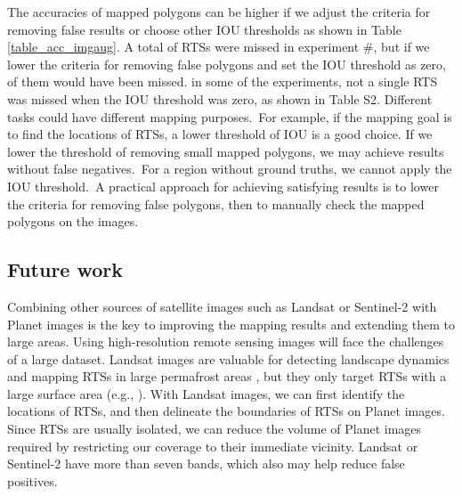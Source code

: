 \documentclass[authoryear,preprint,review,12pt]{elsarticle}
\begin{document}
The accuracies of mapped polygons can be higher if we adjust the criteria for removing false results or choose other IOU thresholds as shown in Table \ref{table_acc_imgaug}. 
A total of  RTSs were missed in experiment \#, but if we lower the criteria for removing false polygons and set the IOU threshold as zero,  of them would have been missed.  in some of the experiments, not a single RTS was missed when the IOU threshold was zero, as shown in Table S2. Different tasks could have different mapping purposes.~For example, if the mapping goal is to find the locations of RTSs, a lower threshold of IOU is a good choice. If we lower the threshold of removing small mapped polygons, we may achieve results without false negatives.~For a region without ground truths, we cannot apply the IOU threshold.~A practical approach for achieving satisfying results is to lower the criteria for removing false polygons, then to manually check the mapped polygons on the images. 


\subsection{Future work}
\label{subsec_future}

Combining other sources of satellite images such as Landsat or Sentinel-2 with Planet images is the key to improving the mapping results and extending them to large areas. Using high-resolution remote sensing images will face the challenges of a large dataset. Landsat images are valuable for detecting landscape dynamics and mapping RTSs in large permafrost areas \citep{nitze_detection_2016, nitze_landsat-based_2017, nitze2018remote}, but they 
only target RTSs with a large surface area (e.g., \citealp{brooker2014investigating}). With Landsat images, we can first identify the locations of RTSs, and then delineate the boundaries of RTSs on Planet images. Since RTSs are usually isolated, we can reduce the volume of Planet images required by restricting our coverage to their immediate vicinity.
Landsat or Sentinel-2 have more than seven bands, which also may help reduce false positives. 
\end{document}
